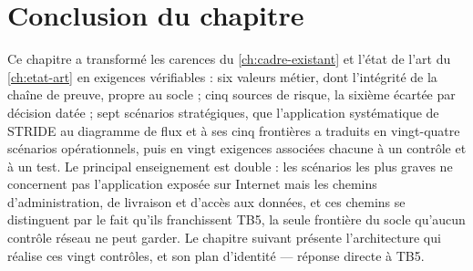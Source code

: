 \section*{Conclusion du chapitre}

Ce chapitre a transformé les carences du \cref{ch:cadre-existant} et l'état de l'art du \cref{ch:etat-art} en exigences
vérifiables : six valeurs métier, dont l'intégrité de la chaîne de preuve, propre au socle ; cinq
sources de risque, la sixième écartée par décision datée ; sept scénarios stratégiques, que
l'application systématique de STRIDE au diagramme de flux et à ses cinq frontières a traduits en
vingt-quatre scénarios opérationnels, puis en vingt exigences associées chacune à un contrôle et à
un test. Le principal enseignement est double : les scénarios les plus graves ne concernent pas
l'application exposée sur Internet mais les chemins d'administration, de livraison et d'accès aux
données, et ces chemins se distinguent par le fait qu'ils franchissent TB5, la seule frontière du
socle qu'aucun contrôle réseau ne peut garder. Le chapitre suivant présente l'architecture qui
réalise ces vingt contrôles, et son plan d'identité --- réponse directe à TB5.

\setlength{\textfloatsep}{20pt plus 2pt minus 4pt}
\setlength{\floatsep}{12pt plus 2pt minus 2pt}
\setlength{\intextsep}{12pt plus 2pt minus 2pt}
\setlength{\abovecaptionskip}{10pt}
\setlength{\belowcaptionskip}{0pt}
\setlength{\LTpre}{\bigskipamount}\setlength{\LTpost}{\bigskipamount}
